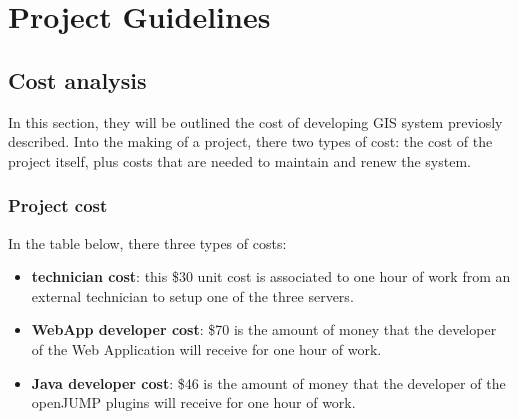 \section{Project Guidelines}

\subsection{Cost analysis}
In this section, they will be outlined the cost of developing GIS system previosly described.
Into the making of a project, there two types of cost: the cost of the project itself, plus costs that are needed to maintain and renew the system.

\subsubsection{Project cost}
In the table below, there three types of costs:
\begin{itemize}
    \item \textbf{technician cost}: this \$30  unit cost is associated to one hour of work from an external technician to setup one of the three servers.
    \item \textbf{WebApp developer cost}: \$70 is the amount of money that the developer of the Web Application will receive for one hour of work.
    \item \textbf{Java developer cost}: \$46 is the amount of money that the developer of the openJUMP plugins will receive for one hour of work. 
\end{itemize}

